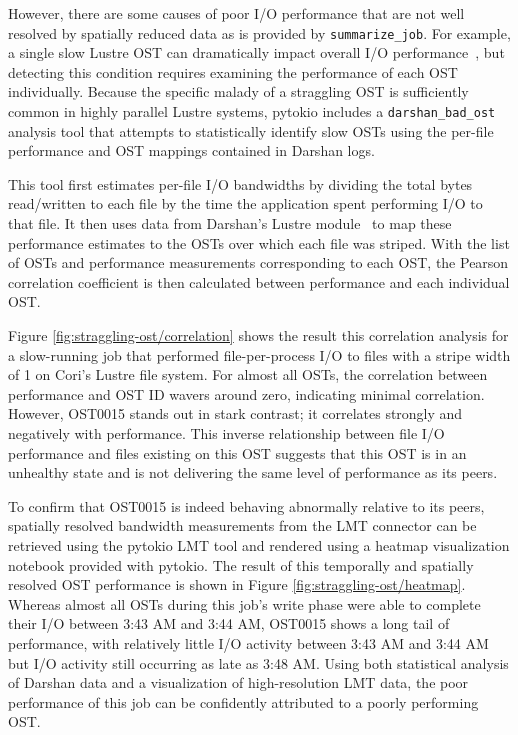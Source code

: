 However, there are some causes of poor I/O performance that are not well resolved by spatially reduced data as is provided by \texttt{summarize\_job}.
For example, a single slow Lustre OST can dramatically impact overall I/O performance~\cite{Byna2013}, but detecting this condition requires examining the performance of each OST individually.
Because the specific malady of a straggling OST is sufficiently common in highly parallel Lustre systems, pytokio includes a \texttt{darshan\_bad\_ost} analysis tool that attempts to statistically identify slow OSTs using the per-file performance and OST mappings contained in Darshan logs.

This tool first estimates per-file I/O bandwidths by dividing the total bytes read/written to each file by the time the application spent performing I/O to that file.
It then uses data from Darshan's Lustre module~\cite{Snyder2016modular} to map these performance estimates to the OSTs over which each file was striped.
With the list of OSTs and performance measurements corresponding to each OST, the Pearson correlation coefficient is then calculated between performance and each individual OST.

Figure \ref{fig:straggling-ost/correlation} shows the result this correlation analysis for a  slow-running job that performed file-per-process I/O to files with a stripe width of 1 on Cori's Lustre file system.
For almost all OSTs, the correlation between performance and OST ID wavers around zero, indicating minimal correlation.
However, OST0015 stands out in stark contrast; it correlates strongly and negatively with performance. 
This inverse relationship between file I/O performance and files existing on this OST suggests that this OST is in an unhealthy state and is not delivering the same level of performance as its peers.

To confirm that OST0015 is indeed behaving abnormally relative to its peers, spatially resolved bandwidth measurements from the LMT connector can be retrieved using the pytokio LMT tool and rendered using a heatmap visualization notebook provided with pytokio.
The result of this temporally and spatially resolved OST performance is shown in Figure \ref{fig:straggling-ost/heatmap}.
Whereas almost all OSTs during this job's write phase were able to complete their I/O between 3:43 AM and 3:44 AM, OST0015 shows a long tail of performance, with relatively little I/O activity between 3:43 AM and 3:44 AM but I/O activity still occurring as late as 3:48 AM.
Using both statistical analysis of Darshan data and a visualization of high-resolution LMT data, the poor performance of this job can be confidently attributed to a poorly performing OST.

